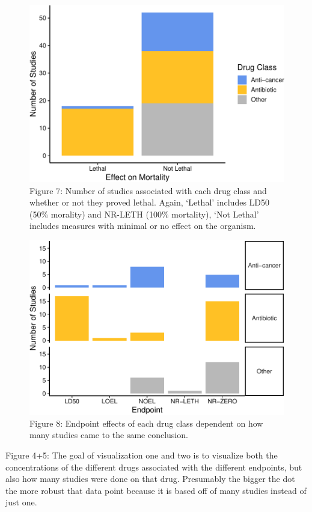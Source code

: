 \documentclass[12pt,]{article}
\begin{document}
\begin{figure}
\centering
\includegraphics{Reents_ENV872L_Project_files/figure-latex/visualization4-1.pdf}
\caption{Figure 7: Number of studies associated with each drug class and
whether or not they proved lethal. Again, `Lethal' includes LD50 (50\%
morality) and NR-LETH (100\% mortality), `Not Lethal' includes measures
with minimal or no effect on the organism.}
\end{figure}

\begin{figure}
\centering
\includegraphics{Reents_ENV872L_Project_files/figure-latex/visualization5-1.pdf}
\caption{Figure 8: Endpoint effects of each drug class dependent on how
many studies came to the same conclusion.}
\end{figure}

Figure 4+5: The goal of visualization one and two is to visualize both
the concentrations of the different drugs associated with the different
endpoints, but also how many studies were done on that drug. Presumably
the bigger the dot the more robust that data point because it is based
off of many studies instead of just one.
\end{document}
